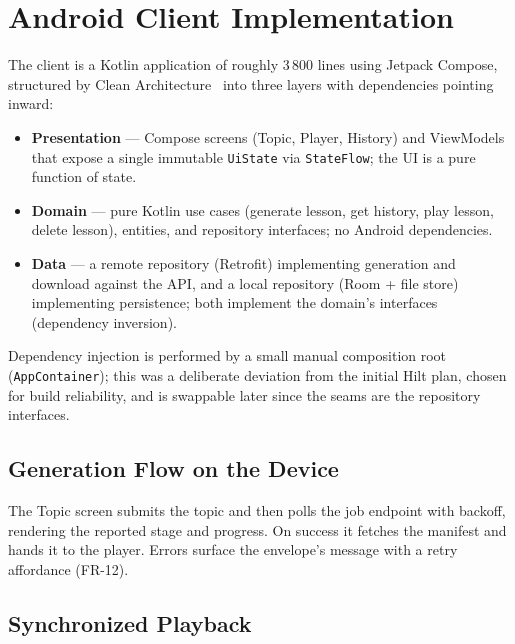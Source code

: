 \section{Android Client Implementation}
\label{sec:clientimpl}

The client is a Kotlin application of roughly 3\,800 lines using Jetpack
Compose, structured by Clean Architecture~\cite{martin2017clean} into three
layers with dependencies pointing inward:

\begin{itemize}
  \item \textbf{Presentation} --- Compose screens (Topic, Player, History)
        and ViewModels that expose a single immutable \texttt{UiState} via
        \texttt{StateFlow}; the UI is a pure function of state.
  \item \textbf{Domain} --- pure Kotlin use cases (generate lesson, get
        history, play lesson, delete lesson), entities, and repository
        interfaces; no Android dependencies.
  \item \textbf{Data} --- a remote repository (Retrofit) implementing
        generation and download against the API, and a local repository
        (Room + file store) implementing persistence; both implement the
        domain's interfaces (dependency inversion).
\end{itemize}

Dependency injection is performed by a small manual composition root
(\texttt{AppContainer}); this was a deliberate deviation from the initial
Hilt plan, chosen for build reliability, and is swappable later since the
seams are the repository interfaces.

\subsection{Generation Flow on the Device}

The Topic screen submits the topic and then polls the job endpoint with
backoff, rendering the reported stage and progress. On success it fetches the
manifest and hands it to the player. Errors surface the envelope's message
with a retry affordance (FR-12).

\subsection{Synchronized Playback}

